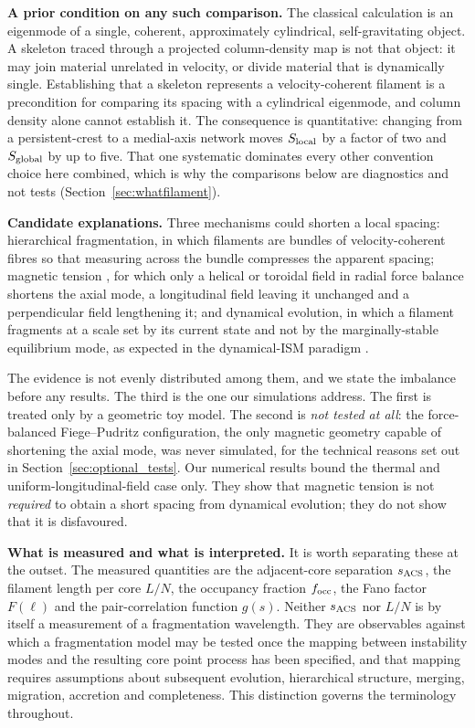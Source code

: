 \documentclass[usenatbib,twoside,twocolumn]{mnras}
\begin{document}
\smallskip\noindent\textbf{A prior condition on any such comparison.} The classical calculation is an eigenmode of a single, coherent, approximately cylindrical, self-gravitating object. A skeleton traced through a projected column-density map is not that object: it may join material unrelated in velocity, or divide material that is dynamically single. Establishing that a skeleton represents a velocity-coherent filament is a precondition for comparing its spacing with a cylindrical eigenmode, and column density alone cannot establish it. The consequence is quantitative: changing from a persistent-crest to a medial-axis network moves $S_{\rm local}$ by a factor of two and $S_{\rm global}$ by up to five. That one systematic dominates every other convention choice here combined, which is why the comparisons below are diagnostics and not tests (Section~\ref{sec:whatfilament}).

\smallskip\noindent\textbf{Candidate explanations.} Three mechanisms could shorten a local spacing: hierarchical fragmentation, in which filaments are bundles of velocity-coherent fibres \citep{Hacar2013,Hacar2018,Yang2024} so that measuring across the bundle compresses the apparent spacing; magnetic tension \citep{Nakamura1993}, for which only a helical or toroidal field in radial force balance shortens the axial mode, a longitudinal field leaving it unchanged and a perpendicular field lengthening it; and dynamical evolution, in which a filament fragments at a scale set by its current state and not by the marginally-stable equilibrium mode, as expected in the dynamical-ISM paradigm \citep{Andre2014,Clarke2016,Clarke2017,Clarke2020}.

The evidence is not evenly distributed among them, and we state the imbalance before any results. The third is the one our simulations address. The first is treated only by a geometric toy model. The second is \emph{not tested at all}: the force-balanced Fiege--Pudritz configuration, the only magnetic geometry capable of shortening the axial mode, was never simulated, for the technical reasons set out in Section~\ref{sec:optional_tests}. Our numerical results bound the thermal and uniform-longitudinal-field case only. They show that magnetic tension is not \emph{required} to obtain a short spacing from dynamical evolution; they do not show that it is disfavoured.

\smallskip\noindent\textbf{What is measured and what is interpreted.} It is worth separating these at the outset. The measured quantities are the adjacent-core separation $s_{\rm ACS}$, the filament length per core $L/N$, the occupancy fraction $f_{\rm occ}$, the Fano factor $F(\ell)$ and the pair-correlation function $g(s)$. Neither $s_{\rm ACS}$ nor $L/N$ is by itself a measurement of a fragmentation wavelength. They are observables against which a fragmentation model may be tested once the mapping between instability modes and the resulting core point process has been specified, and that mapping requires assumptions about subsequent evolution, hierarchical structure, merging, migration, accretion and completeness. This distinction governs the terminology throughout.
\end{document}
